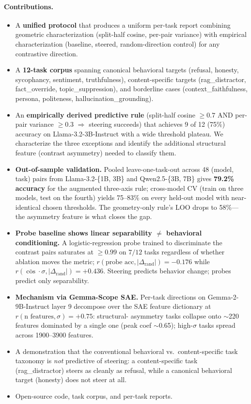 \documentclass[11pt]{article}
\begin{document}
\paragraph{Contributions.}
\begin{itemize}
\item A \textbf{unified protocol} that produces a uniform per-task
report combining geometric characterization (split-half cosine,
per-pair variance) with empirical characterization (baseline,
steered, random-direction control) for any contrastive
direction.
\item A \textbf{12-task corpus} spanning canonical behavioral targets
(refusal, honesty, sycophancy, sentiment, truthfulness),
content-specific targets (rag\_distractor, fact\_override,
topic\_suppression), and borderline cases (context\_faithfulness,
persona, politeness, hallucination\_grounding).
\item An \textbf{empirically derived predictive rule} (split-half
cosine $\geq 0.7$ AND per-pair variance $\geq 0.3$ $\Rightarrow$
steering succeeds) that achieves 9 of 12 (75\%) accuracy on
Llama-3.2-3B-Instruct with a wide threshold plateau. We characterize
the three exceptions and identify the additional structural feature
(contrast asymmetry) needed to classify them.
\item \textbf{Out-of-sample validation.} Pooled leave-one-task-out
across 48 (model, task) pairs from Llama-3.2-\{1B, 3B\} and
Qwen2.5-\{3B, 7B\} gives \textbf{79.2\% accuracy} for the augmented
three-axis rule; cross-model CV (train on three models, test on the
fourth) yields 75--83\% on every held-out model with near-identical
chosen thresholds. The geometry-only rule's LOO drops to 58\%---
the asymmetry feature is what closes the gap.
\item \textbf{Probe baseline shows linear separability $\neq$
behavioral conditioning.} A logistic-regression probe trained to
discriminate the contrast pairs saturates at $\geq 0.99$ on $7/12$
tasks regardless of whether ablation moves the metric;
$r(\text{probe acc}, |\Delta_{\text{rand}}|) = -0.176$ while
$r(\bar{\cos}\cdot\sigma, |\Delta_{\text{rand}}|) = +0.436$.
Steering predicts behavior change; probes predict only
separability.
\item \textbf{Mechanism via Gemma-Scope SAE.} Per-task directions
on Gemma-2-9B-Instruct layer 9 decompose over the SAE feature
dictionary at $r(\text{n features}, \sigma) = +0.75$: structural-
asymmetry tasks collapse onto $\sim$220 features dominated by a
single one (peak coef $\sim$0.65); high-$\sigma$ tasks spread
across 1900--3900 features.
\item A demonstration that the conventional behavioral
vs.~content-specific task taxonomy is \emph{not} predictive of
steering: a content-specific task (rag\_distractor) steers as
cleanly as refusal, while a canonical behavioral target (honesty)
does not steer at all.
\item Open-source code, task corpus, and per-task reports.
\end{itemize}
\end{document}
